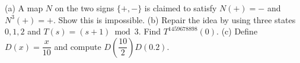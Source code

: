 (a) A map $N$ on the two signs $\{+,-\}$ is claimed to satisfy $N(+)=-$ and $N^3(+)=+$. Show this is impossible. (b) Repair the idea by using three states $0,1,2$ and $T(s)=(s+1)\bmod3$. Find $T^{1459678898}(0)$. (c) Define $D(x)=\dfrac{x}{10}$ and compute $D(\dfrac{10}{2})D(0.2)$.
